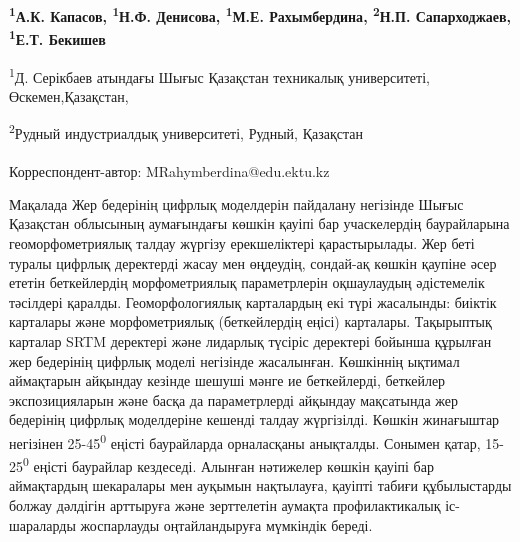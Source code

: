 
\begin{articleheader}

{\bfseries
\textsuperscript{1}А.К. Капасов,
\textsuperscript{1}Н.Ф. Денисова,
\textsuperscript{1}М.Е. Рахымбердина\textsuperscript{\envelope },
\textsuperscript{2}Н.П. Сапарходжаев,
\textsuperscript{1}Е.Т. Бекишев
}
\end{articleheader}


\begin{affiliation}
\textsuperscript{1}Д. Серікбаев атындағы Шығыс Қазақстан техникалық университеті, Өскемен,Қазақстан,

\textsuperscript{2}Рудный индустриалдық университеті, Рудный, Қазақстан

\raggedright \textsuperscript{\envelope }Корреспондент-автор: MRahymberdina@edu.ektu.kz
\end{affiliation}

Мақалада Жер бедерінің цифрлық моделдерін пайдалану негізінде Шығыс
Қазақстан облысының аумағындағы көшкін қауіпі бар учаскелердің
баурайларына геоморфометриялық талдау жүргізу ерекшеліктері
қарастырылады. Жер беті туралы цифрлық деректерді жасау мен өңдеудің,
сондай-ақ көшкін қаупіне әсер ететін беткейлердің морфометриялық
параметрлерін оқшаулаудың әдістемелік тәсілдері қаралды.
Геоморфологиялық карталардың екі түрі жасалынды: биіктік карталары және
морфометриялық (беткейлердің еңісі) карталары. Тақырыптық карталар SRTM
деректері және лидарлық түсіріс деректері бойынша құрылған жер бедерінің
цифрлық моделі негізінде жасалынған. Көшкіннің ықтимал аймақтарын
айқындау кезінде шешуші мәнге ие беткейлерді, беткейлер экспозицияларын
және басқа да параметрлерді айқындау мақсатында жер бедерінің цифрлық
моделдеріне кешенді талдау жүргізілді. Көшкін жинағыштар негізінен
25-45\textsuperscript{0} еңісті баурайларда орналасқаны анықталды.
Сонымен қатар, 15-25\textsuperscript{0} еңісті баурайлар кездеседі.
Алынған нәтижелер көшкін қауіпі бар аймақтардың шекаралары мен ауқымын
нақтылауға, қауіпті табиғи құбылыстарды болжау дәлдігін арттыруға және
зерттелетін аумақта профилактикалық іс-шараларды жоспарлауды
оңтайландыруға мүмкіндік береді.

